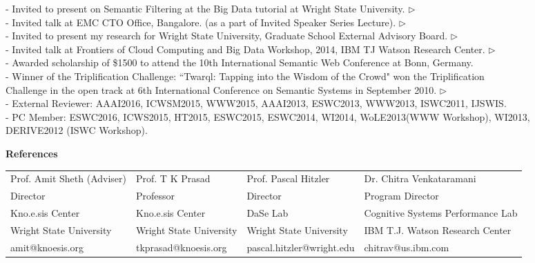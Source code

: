 \documentclass[letterpaper,9pt]{article}
\newcommand{\resheading}[1]{{\large \colorbox{mygrey}{\begin{minipage}{\textwidth}{\textbf{#1 \vphantom{p\^{E}}}}\end{minipage}}}}
\begin{document}
- Invited to present on Semantic Filtering at the Big Data tutorial at Wright State University. \href{http://www.slideshare.net/pavankapanipathi/knoesissemantic-filteringtutorials}{$\triangleright$}\\ 
-  Invited talk at EMC CTO Office, Bangalore. (as a part of Invited Speaker Series Lecture). \href{http://www.slideshare.net/pavankapanipathi/emc-final2}{$\triangleright$}\\ 
-  Invited to present my research for Wright State University, Graduate School External Advisory Board. \href{http://www.slideshare.net/knoesis/pavan-knoesisresearchaccomplishmentsfinal}{$\triangleright$}\\
-  Invited talk at Frontiers of Cloud Computing and Big Data Workshop, 2014, IBM TJ Watson Research Center. \href{http://www.slideshare.net/knoesis/pavan-ibmaddressing-volume-and-velocity-challenge-on-the-socialfinal}{$\triangleright$}\\ 
-  Awarded scholarship of \$1500 to attend the 10th International Semantic Web Conference at Bonn, Germany. \\
-  Winner of the Triplification Challenge: ``Twarql: Tapping into the Wisdom of the Crowd" won the Triplification \\ \hspace{0.7em}Challenge in the open track at 6th International Conference on Semantic Systems in September 2010. \href{http://knoesis.org/library/resource.php?id=1104}{$\triangleright$}\\ 
-  External Reviewer: AAAI2016, ICWSM2015, WWW2015, AAAI2013, ESWC2013, WWW2013, ISWC2011, IJSWIS.\\
-  PC Member: ESWC2016, ICWS2015, HT2015, ESWC2015, ESWC2014, WI2014, WoLE2013(WWW Workshop), WI2013, \\ \hspace{0.7em}DERIVE2012 (ISWC Workshop).\\

\vspace{0.03in}

\resheading{References}
\vspace{0.03in}

\begin{tabular}{ p{4.5cm} p{4.5cm} p{4.5cm} p{6cm}}
  Prof. Amit Sheth (Adviser)  & Prof. T K Prasad & Prof. Pascal Hitzler & Dr. Chitra Venkataramani\\
  Director & Professor & Director & Program Director\\
  Kno.e.sis Center & Kno.e.sis Center & DaSe Lab & Cognitive Systems Performance Lab\\
  Wright State University &  Wright State University &  Wright State University & IBM T.J. Watson Research Center\\
  amit@knoesis.org & tkprasad@knoesis.org & pascal.hitzler@wright.edu & chitrav@us.ibm.com
\end{tabular}
\end{document}
